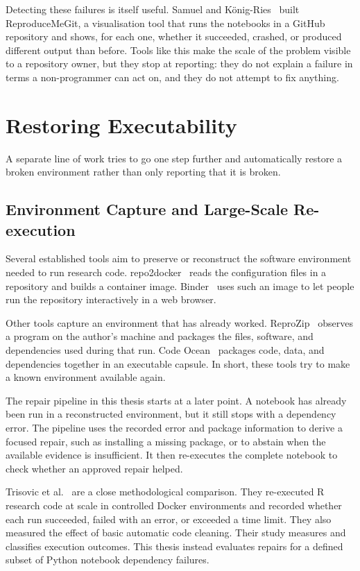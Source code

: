 Detecting these failures is itself useful. Samuel and
K{\"o}nig-Ries~\cite{samuel2020reproducemegit} built ReproduceMeGit, a
visualisation tool that runs the notebooks in a GitHub repository and shows,
for each one, whether it succeeded, crashed, or produced different output
than before. Tools like this make the scale of the problem visible to a
repository owner, but they stop at reporting: they do not explain a failure
in terms a non-programmer can act on, and they do not attempt to fix
anything.

\section{Restoring Executability}
\label{sec:rw-restoring}

A separate line of work tries to go one step further and automatically
restore a broken environment rather than only reporting that it is broken.

\subsection{Environment Capture and Large-Scale Re-execution}

Several established tools aim to preserve or reconstruct the software
environment needed to run research code. repo2docker~\cite{forde2018repo2docker}
reads the configuration files in a repository and builds a container image.
Binder~\cite{jupyter2018binder} uses such an image to let people run the
repository interactively in a web browser.

Other tools capture an environment that has already worked. ReproZip~\cite{rampin2016reprozip}
observes a program on the author's machine and packages the files, software,
and dependencies used during that run. Code Ocean~\cite{cheifet2021codeocean}
packages code, data, and dependencies together in an executable capsule.
In short, these tools try to make a known environment available again.

The repair pipeline in this thesis starts at a later point. A notebook has
already been run in a reconstructed environment, but it still stops with a
dependency error. The pipeline uses the recorded error and package information
to derive a focused repair, such as installing a missing package, or to abstain
when the available evidence is insufficient. It then re-executes the complete
notebook to check whether an approved repair helped.

Trisovic et al.~\cite{trisovic2022execution} are a close methodological
comparison. They re-executed R research code at scale in controlled Docker
environments and recorded whether each run succeeded, failed with an error,
or exceeded a time limit. They also measured the effect of basic automatic
code cleaning. Their study measures and classifies execution outcomes. This
thesis instead evaluates repairs for a defined subset of Python notebook
dependency failures.

